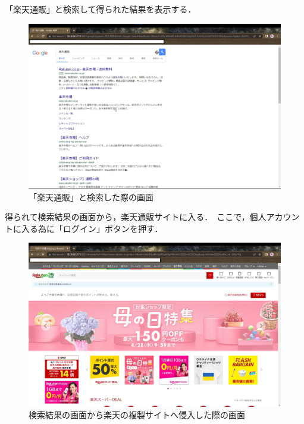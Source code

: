 \documentclass[dvipdfmx]{jsarticle}
\begin{document}
                    「楽天通販」と検索して得られた結果を表示する．\
                    \begin{figure}[pth]
                        \centering
                        \includegraphics[width=15cm]{img/rakuten/rakuten-02.png}
                        \caption{「楽天通販」と検索した際の画面}
                        \label{rakuten-02}
                    \end{figure}
                    得られて検索結果の画面から，楽天通販サイトに入る．\
                    ここで，個人アカウントに入る為に「ログイン」ボタンを押す．
                    \begin{figure}[pth]
                        \centering
                        \includegraphics[width=15cm]{img/rakuten/rakuten-03.png}
                        \caption{検索結果の画面から楽天の複製サイトへ侵入した際の画面}
                        \label{rakuten-03}
                    \end{figure}
\end{document}
